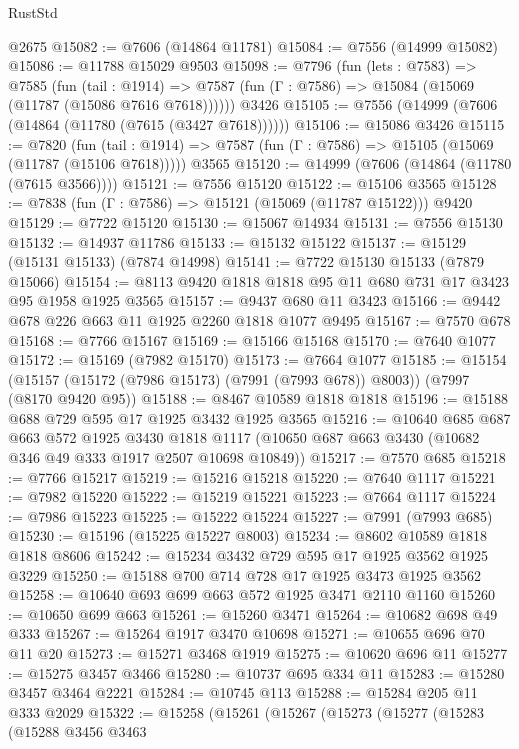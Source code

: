 \begin{lexlean}{RustStd}
\begin{coremodule}
    @2675
@15082 := @7606 (@14864 @11781)
@15084 := @7556 (@14999 @15082)
@15086 := @11788 @15029 @9503
@15098 := @7796
    (fun (lets : @7583) =>
    @7585
      (fun (tail : @1914) =>
      @7587 (fun (Γ : @7586) => @15084 (@15069 (@11787 (@15086 @7616 @7618))))))
    @3426
@15105 := @7556 (@14999 (@7606 (@14864 (@11780 (@7615 (@3427 @7618))))))
@15106 := @15086 @3426
@15115 := @7820
    (fun (tail : @1914) => @7587 (fun (Γ : @7586) => @15105 (@15069 (@11787 (@15106 @7618)))))
    @3565
@15120 := @14999 (@7606 (@14864 (@11780 (@7615 @3566))))
@15121 := @7556 @15120
@15122 := @15106 @3565
@15128 := @7838 (fun (Γ : @7586) => @15121 (@15069 (@11787 @15122))) @9420
@15129 := @7722 @15120
@15130 := @15067 @14934
@15131 := @7556 @15130
@15132 := @14937 @11786
@15133 := @15132 @15122
@15137 := @15129 (@15131 @15133) (@7874 @14998)
@15141 := @7722 @15130 @15133 (@7879 @15066)
@15154 := @8113 @9420 @1818 @1818 @95 @11 @680 @731 @17 @3423 @95 @1958 @1925 @3565
@15157 := @9437 @680 @11 @3423
@15166 := @9442 @678 @226 @663 @11 @1925 @2260 @1818 @1077 @9495
@15167 := @7570 @678
@15168 := @7766 @15167
@15169 := @15166 @15168
@15170 := @7640 @1077
@15172 := @15169 (@7982 @15170)
@15173 := @7664 @1077
@15185 := @15154
    (@15157 (@15172 (@7986 @15173) (@7991 (@7993 @678)) @8003))
    (@7997 (@8170 @9420 @95))
@15188 := @8467 @10589 @1818 @1818
@15196 := @15188 @688 @729 @595 @17 @1925 @3432 @1925 @3565
@15216 := @10640
    @685
    @687
    @663
    @572
    @1925
    @3430
    @1818
    @1117
    (@10650 @687 @663 @3430 (@10682 @346 @49 @333 @1917 @2507 @10698 @10849))
@15217 := @7570 @685
@15218 := @7766 @15217
@15219 := @15216 @15218
@15220 := @7640 @1117
@15221 := @7982 @15220
@15222 := @15219 @15221
@15223 := @7664 @1117
@15224 := @7986 @15223
@15225 := @15222 @15224
@15227 := @7991 (@7993 @685)
@15230 := @15196 (@15225 @15227 @8003)
@15234 := @8602 @10589 @1818 @1818 @8606
@15242 := @15234 @3432 @729 @595 @17 @1925 @3562 @1925 @3229
@15250 := @15188 @700 @714 @728 @17 @1925 @3473 @1925 @3562
@15258 := @10640 @693 @699 @663 @572 @1925 @3471 @2110 @1160
@15260 := @10650 @699 @663
@15261 := @15260 @3471
@15264 := @10682 @698 @49 @333
@15267 := @15264 @1917 @3470 @10698
@15271 := @10655 @696 @70 @11 @20
@15273 := @15271 @3468 @1919
@15275 := @10620 @696 @11
@15277 := @15275 @3457 @3466
@15280 := @10737 @695 @334 @11
@15283 := @15280 @3457 @3464 @2221
@15284 := @10745 @113
@15288 := @15284 @205 @11 @333 @2029
@15322 := @15258
    (@15261
      (@15267
        (@15273
          (@15277
            (@15283
              (@15288
                @3456
                @3463

\end{coremodule}
\end{lexlean}
